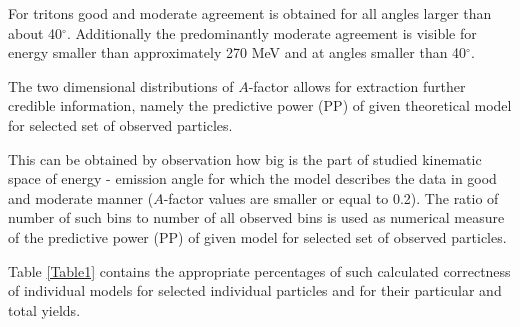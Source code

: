 For tritons good and moderate agreement is
obtained for all angles larger than about 40$^{\circ}$. 
Additionally the predominantly moderate agreement is visible 
for energy smaller than approximately 270 MeV and at angles smaller than 40$^{\circ}$.

 \par

The two dimensional distributions 
of $A$-factor allows for extraction further credible information,
namely the predictive power (PP) of given theoretical model for selected set of observed particles.

This can be obtained by observation how big is the part of studied
kinematic space of energy - emission angle for which the model describes the data in good and moderate manner ($A$-factor values are smaller or equal to 0.2). 
The ratio of number of such bins to number of all observed bins 
is used as numerical measure of the predictive power (PP) of given model for selected set of observed particles.

Table \ref{Table1} contains the appropriate percentages of
such calculated correctness of individual models for selected individual particles and for their particular and total yields.

